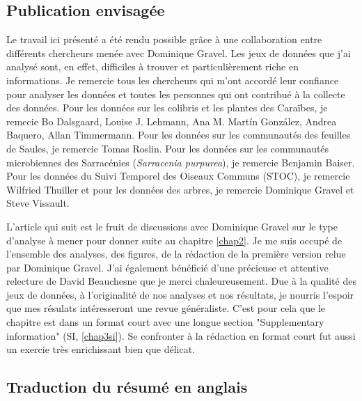 \subsection{Publication envisagée}

Le travail ici présenté a été rendu possible grâce à une collaboration entre différents
chercheurs menée avec Dominique Gravel. Les jeux de données que j'ai analysé
sont, en effet, difficiles à trouver et particulièrement riche en informations.
Je remercie tous les chercheurs qui m'ont accordé leur confiance
pour analyser les données et toutes les personnes qui ont contribué à la collecte
des données. Pour les données sur les colibris et les plantes des Caraïbes,
je remecie Bo Dalsgaard, Louise J. Lehmann, Ana M. Martín González,
Andrea Baquero, Allan Timmermann. Pour les données sur les communautés des feuilles de Saules,
je remercie Tomas Roslin. Pour les données sur les communautés microbiennes des
Sarracénies (\emph{Sarracenia purpurea}), je remercie Benjamin Baiser.
Pour les données du Suivi Temporel des Oiseaux Communs (STOC), je remercie Wilfried Thuiller
et pour les données des arbres, je remercie Dominique Gravel et Steve Vissault.

L'article qui suit est le fruit de discussions avec Dominique Gravel sur le type
d'analyse à mener pour donner suite au chapitre \ref{chap2}. Je me suis occupé
de l'ensemble des analyses, des figures, de la rédaction de la première version
relue par Dominique Gravel. J'ai également bénéficié d'une précieuse et
attentive relecture de David Beauchesne que je merci chaleureusement.
Due à la qualité des jeux de données, à l'originalité de nos analyses et
nos résultats, je nourris l'espoir que mes résulats intéresseront
une revue généraliste. C'est pour cela que le chapitre est dans un format court avec une
longue section "Supplementary information" (SI, \ref{chap3si}). Se confronter
à la rédaction en format court fut aussi un exercie très enrichissant bien que délicat.




\subsection{Traduction du résumé en anglais}

